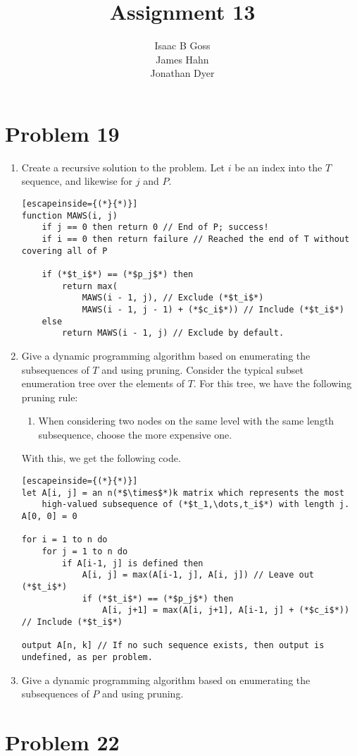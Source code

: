 \documentclass{article}
\author{Isaac B Goss\\ James Hahn\\ Jonathan Dyer}
\title{Assignment 13}
\providecommand{\prob}[1]{\section*{Problem #1}}
\begin{document}
\maketitle

    \prob{19}
    \begin{enumerate}[label=(\alph*)]
        \item Create a recursive solution to the problem.
            Let $i$ be an index into the $T$ sequence, and likewise for $j$ and $P$.
            \begin{lstlisting}[escapeinside={(*}{*)}]
function MAWS(i, j)
    if j == 0 then return 0 // End of P; success!
    if i == 0 then return failure // Reached the end of T without covering all of P

    if (*$t_i$*) == (*$p_j$*) then
        return max(
            MAWS(i - 1, j), // Exclude (*$t_i$*)
            MAWS(i - 1, j - 1) + (*$c_i$*)) // Include (*$t_i$*)
    else
        return MAWS(i - 1, j) // Exclude by default.
            \end{lstlisting}
        \item Give a dynamic programming algorithm based on enumerating the subsequences of $T$ and using pruning.
            Consider the typical subset enumeration tree over the elements of $T$.
            For this tree, we have the following pruning rule:
            \begin{enumerate}[label=\arabic*.]
                \item When considering two nodes on the same level with the same length subsequence, choose the more expensive one.
            \end{enumerate}

            With this, we get the following code.
            \begin{lstlisting}[escapeinside={(*}{*)}]
let A[i, j] = an n(*$\times$*)k matrix which represents the most
    high-valued subsequence of (*$t_1,\dots,t_i$*) with length j.
A[0, 0] = 0

for i = 1 to n do
    for j = 1 to n do
        if A[i-1, j] is defined then
            A[i, j] = max(A[i-1, j], A[i, j]) // Leave out (*$t_i$*)
            if (*$t_i$*) == (*$p_j$*) then
                A[i, j+1] = max(A[i, j+1], A[i-1, j] + (*$c_i$*)) // Include (*$t_i$*)

output A[n, k] // If no such sequence exists, then output is undefined, as per problem.
            \end{lstlisting}

        \item Give a dynamic programming algorithm based on enumerating the subsequences of $P$ and using pruning.
    \end{enumerate}

    \prob{22}
\end{document}
